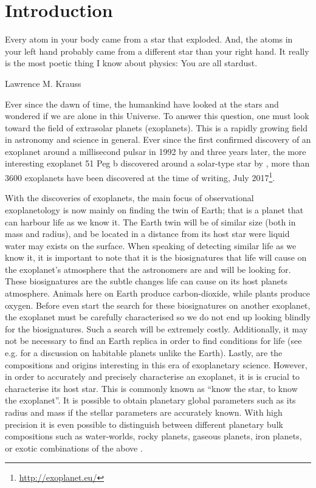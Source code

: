 \chapter{Introduction}
\label{cha:introduction}
\epigraph{Every atom in your body came from a star that exploded. And, the atoms in your left hand
          probably came from a different star than your right hand. It really is the most poetic
          thing I know about physics: You are all stardust.}{Lawrence M. Krauss}

Ever since the dawn of time, the humankind have looked at the stars and wondered if we are alone in
this Universe. To answer this question, one must look toward the field of extrasolar planets
(exoplanets). This is a rapidly growing field in astronomy and science in general. Ever since the
first confirmed discovery of an exoplanet around a millisecond pulsar in 1992 by
\citet{Wolszczan1992} and three years later, the more interesting exoplanet 51 Peg b discovered
around a solar-type star by \citet{Mayor1995}, more than 3600 exoplanets have been discovered at the
time of writing, July 2017\footnote{\url{http://exoplanet.eu/}}.

With the discoveries of exoplanets, the main focus of observational exoplanetology is now mainly on
finding the twin of Earth; that is a planet that can harbour life as we know it. The Earth twin will
be of similar size (both in mass and radius), and be located in a distance from its host star were
liquid water may exists on the surface. When speaking of detecting similar life as we know it, it is
important to note that it is the biosignatures that life will cause on the exoplanet's atmosphere
that the astronomers are and will be looking for. These biosignatures are the subtle changes life
can cause on its host planets atmosphere. Animals here on Earth produce carbon-dioxide, while plants
produce oxygen. Before even start the search for these biosignatures on another exoplanet, the
exoplanet must be carefully characterised so we do not end up looking blindly for the biosignatures.
Such a search will be extremely costly. Additionally, it may not be necessary to find an Earth
replica in order to find conditions for life (see e.g. \citet{Alibert2014} for a discussion on
habitable planets unlike the Earth). Lastly, are the compositions and origins interesting in this
era of exoplanetary science. However, in order to accurately and precisely characterise an
exoplanet, it is is crucial to characterise its host star. This is commonly known as ``know the
star, to know the exoplanet''. It is possible to obtain planetary global parameters such as its
radius and mass if the stellar parameters are accurately known. With high precision it is even
possible to distinguish between different planetary bulk compositions such as water-worlds, rocky
planets, gaseous planets, iron planets, or exotic combinations of the above \citep[see
e.g.][]{Dorn2015,Thiabaud2014}.

